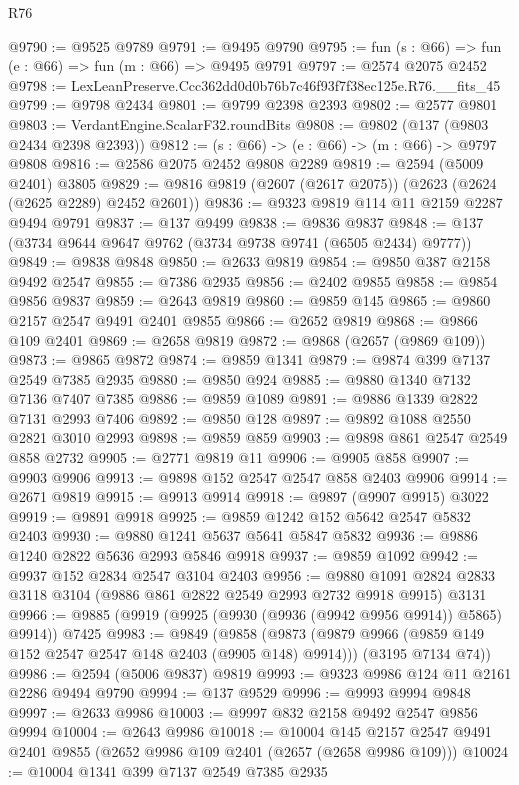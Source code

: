\begin{lexlean}{R76}
\begin{coremodule}
@9790 := @9525 @9789
@9791 := @9495 @9790
@9795 := fun (s : @66) => fun (e : @66) => fun (m : @66) => @9495 @9791
@9797 := @2574 @2075 @2452
@9798 := LexLeanPreserve.Ccc362dd0d0b76b7c46f93f7f38ec125e.R76.__fits_45
@9799 := @9798 @2434
@9801 := @9799 @2398 @2393
@9802 := @2577 @9801
@9803 := VerdantEngine.ScalarF32.roundBits
@9808 := @9802 (@137 (@9803 @2434 @2398 @2393))
@9812 := (s : @66) -> (e : @66) -> (m : @66) -> @9797 @9808
@9816 := @2586 @2075 @2452 @9808 @2289
@9819 := @2594 (@5009 @2401) @3805
@9829 := @9816 @9819 (@2607 (@2617 @2075)) (@2623 (@2624 (@2625 @2289) @2452 @2601))
@9836 := @9323 @9819 @114 @11 @2159 @2287 @9494 @9791
@9837 := @137 @9499
@9838 := @9836 @9837
@9848 := @137 (@3734 @9644 @9647 @9762 (@3734 @9738 @9741 (@6505 @2434) @9777))
@9849 := @9838 @9848
@9850 := @2633 @9819
@9854 := @9850 @387 @2158 @9492 @2547
@9855 := @7386 @2935
@9856 := @2402 @9855
@9858 := @9854 @9856 @9837
@9859 := @2643 @9819
@9860 := @9859 @145
@9865 := @9860 @2157 @2547 @9491 @2401 @9855
@9866 := @2652 @9819
@9868 := @9866 @109 @2401
@9869 := @2658 @9819
@9872 := @9868 (@2657 (@9869 @109))
@9873 := @9865 @9872
@9874 := @9859 @1341
@9879 := @9874 @399 @7137 @2549 @7385 @2935
@9880 := @9850 @924
@9885 := @9880 @1340 @7132 @7136 @7407 @7385
@9886 := @9859 @1089
@9891 := @9886 @1339 @2822 @7131 @2993 @7406
@9892 := @9850 @128
@9897 := @9892 @1088 @2550 @2821 @3010 @2993
@9898 := @9859 @859
@9903 := @9898 @861 @2547 @2549 @858 @2732
@9905 := @2771 @9819 @11
@9906 := @9905 @858
@9907 := @9903 @9906
@9913 := @9898 @152 @2547 @2547 @858 @2403 @9906
@9914 := @2671 @9819
@9915 := @9913 @9914
@9918 := @9897 (@9907 @9915) @3022
@9919 := @9891 @9918
@9925 := @9859 @1242 @152 @5642 @2547 @5832 @2403
@9930 := @9880 @1241 @5637 @5641 @5847 @5832
@9936 := @9886 @1240 @2822 @5636 @2993 @5846 @9918
@9937 := @9859 @1092
@9942 := @9937 @152 @2834 @2547 @3104 @2403
@9956 := @9880 @1091 @2824 @2833 @3118 @3104 (@9886 @861 @2822 @2549 @2993 @2732 @9918 @9915) @3131
@9966 := @9885 (@9919 (@9925 (@9930 (@9936 (@9942 @9956 @9914)) @5865) @9914)) @7425
@9983 := @9849
    (@9858
      (@9873 (@9879 @9966 (@9859 @149 @152 @2547 @2547 @148 @2403 (@9905 @148) @9914)))
      (@3195 @7134 @74))
@9986 := @2594 (@5006 @9837) @9819
@9993 := @9323 @9986 @124 @11 @2161 @2286 @9494 @9790
@9994 := @137 @9529
@9996 := @9993 @9994 @9848
@9997 := @2633 @9986
@10003 := @9997 @832 @2158 @9492 @2547 @9856 @9994
@10004 := @2643 @9986
@10018 := @10004
    @145
    @2157
    @2547
    @9491
    @2401
    @9855
    (@2652 @9986 @109 @2401 (@2657 (@2658 @9986 @109)))
@10024 := @10004 @1341 @399 @7137 @2549 @7385 @2935

\end{coremodule}
\end{lexlean}
